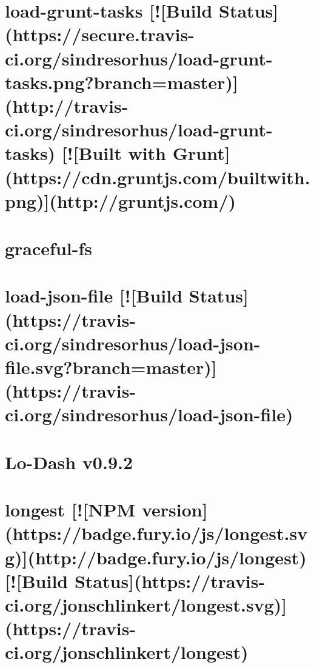 \documentclass[twoside]{book}
\newcommand{\+}{\discretionary{\mbox{\scriptsize$\hookleftarrow$}}{}{}}
\begin{document}
\chapter{load-\/grunt-\/tasks \mbox{[}!\mbox{[}Build Status\mbox{]}(https\+://secure.travis-\/ci.org/sindresorhus/load-\/grunt-\/tasks.png?branch=master)\mbox{]}(http\+://travis-\/ci.org/sindresorhus/load-\/grunt-\/tasks) \mbox{[}!\mbox{[}Built with Grunt\mbox{]}(https\+://cdn.gruntjs.\+com/builtwith.png)\mbox{]}(http\+://gruntjs.com/)}
\label{md_app_web_node_modules_load-grunt-tasks_readme}

\chapter{graceful-\/fs}
\label{md_app_web_node_modules_load-json-file_node_modules_graceful-fs__r_e_a_d_m_e}

\chapter{load-\/json-\/file \mbox{[}!\mbox{[}Build Status\mbox{]}(https\+://travis-\/ci.org/sindresorhus/load-\/json-\/file.svg?branch=master)\mbox{]}(https\+://travis-\/ci.org/sindresorhus/load-\/json-\/file)}
\label{md_app_web_node_modules_load-json-file_readme}

\chapter{Lo-\/\+Dash v0.9.2}
\label{md_app_web_node_modules_lodash__r_e_a_d_m_e}

\chapter{longest \mbox{[}!\mbox{[}N\+PM version\mbox{]}(https\+://badge.fury.\+io/js/longest.svg)\mbox{]}(http\+://badge.fury.\+io/js/longest) \mbox{[}!\mbox{[}Build Status\mbox{]}(https\+://travis-\/ci.org/jonschlinkert/longest.svg)\mbox{]}(https\+://travis-\/ci.org/jonschlinkert/longest)}
\label{md_app_web_node_modules_longest__r_e_a_d_m_e}

\end{document}
